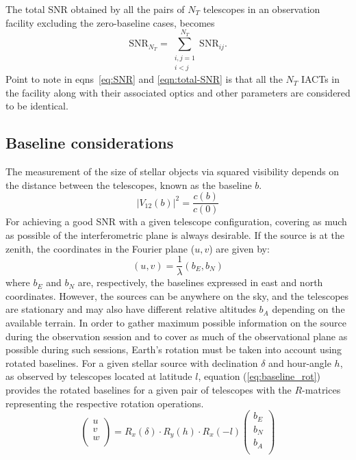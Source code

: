 The total SNR obtained by all the pairs of $N_T$ telescopes in an observation facility excluding the zero-baseline cases, becomes
\begin{equation}
\mathrm{SNR}_{N_T} = \sum_{\substack{i,j =1 \\ i<j}}^{N_T}  {\mathrm {SNR}_{ij}}.
\label{eqn:total-SNR}
\end{equation}
Point to note in eqns~\ref{eq:SNR} and \ref{eqn:total-SNR} is that all the $N_T$ IACTs in the facility along with their associated optics and other parameters are considered to be identical.

\subsection{Baseline considerations}\label{sec:earth}
The measurement of the size of stellar objects via squared visibility depends on the distance between the telescopes, known as the baseline $b$.
\begin{equation}
	|V_{12}(b)|^2 = \frac{c(b)}{c(0)}
	\label{eq:angular_size_meas}
\end{equation}
For achieving a good SNR with a given telescope configuration, covering as much as possible of the interferometric plane is always desirable. If the source is at the zenith, the coordinates in the Fourier plane ($u,v$) are given by:
\begin{equation}
	(u,v) = \frac{1}{\lambda} (b_E, b_N)
\end{equation}
where $b_E$ and $b_N$ are, respectively, the baselines expressed in east and north coordinates. However, the sources can be anywhere on the sky, and the telescopes are stationary and may also have different relative altitudes $b_A$ depending on the available terrain. In order to gather maximum possible information on the source during the observation session and to cover as much of the observational plane as possible during such sessions, Earth's rotation must be taken into account using rotated baselines.  For a given stellar source with declination $\delta$ and hour-angle $h$, as observed by telescopes located at latitude $l$, equation (\ref{eq:baseline_rot}) provides the rotated baselines for a given pair of telescopes \citep[see e.g., eqs.~8--10 from][]{2020MNRAS.498.4577B} with the $R$-matrices representing the respective rotation operations.
\begin{equation}
\begin{pmatrix} u\\ v\\ w\\ \end{pmatrix} = R_x(\delta) \cdot R_y(h) \cdot R_x(-l) \begin{pmatrix} b_E \\ b_N \\ b_A \\ \end{pmatrix}
	\label{eq:baseline_rot}
\end{equation}

